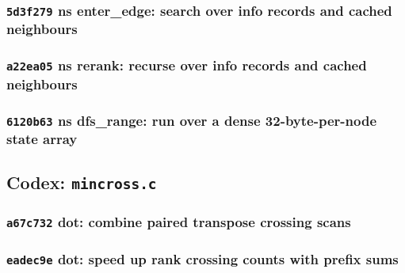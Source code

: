 \subsubsection*{\texttt{5d3f279} ns enter\_edge: search over info records and cached neighbours}


\subsubsection*{\texttt{a22ea05} ns rerank: recurse over info records and cached neighbours}


\subsubsection*{\texttt{6120b63} ns dfs\_range: run over a dense 32-byte-per-node state array}


\subsection{Codex: \texttt{mincross.c}}

\subsubsection*{\texttt{a67c732} dot: combine paired transpose crossing scans}


\subsubsection*{\texttt{eadec9e} dot: speed up rank crossing counts with prefix sums}

